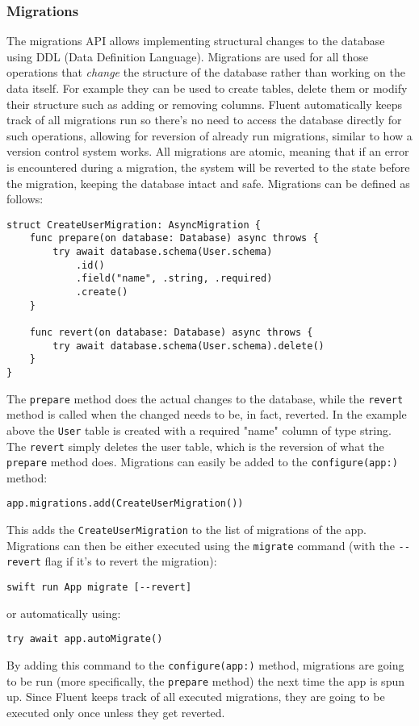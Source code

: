 \subsubsection{Migrations}
The migrations API allows implementing structural changes to the database using DDL (Data Definition Language).
Migrations are used for all those operations that \textit{change} the structure of the database rather than working on the data itself. For example they can be used to create tables, delete them or modify their structure such as adding or removing columns.
Fluent automatically keeps track of all migrations run so there's no need to access the database directly for such operations, allowing for reversion of already run migrations, similar to how a version control system works. All migrations are atomic, meaning that if an error is encountered during a migration, the system will be reverted to the state before the migration, keeping the database intact and safe. 
Migrations can be defined as follows:
\begin{verbatim}
struct CreateUserMigration: AsyncMigration {
    func prepare(on database: Database) async throws {
        try await database.schema(User.schema)
            .id()
            .field("name", .string, .required)
            .create()
    }

    func revert(on database: Database) async throws {
        try await database.schema(User.schema).delete()
    }
}
\end{verbatim}
The \lstinline{prepare} method does the actual changes to the database, while the \lstinline{revert} method is called when the changed needs to be, in fact, reverted. In the example above the \lstinline{User} table is created with a required "name" column of type string. The \lstinline{revert} simply deletes the user table, which is the reversion of what the \lstinline{prepare} method does.
Migrations can easily be added to the \lstinline{configure(app:)} method:
\begin{verbatim}
app.migrations.add(CreateUserMigration())
\end{verbatim}
This adds the \lstinline{CreateUserMigration} to the list of migrations of the app.
Migrations can then be either executed using the \lstinline{migrate} command (with the \lstinline{--revert} flag if it's to revert the migration):
\begin{verbatim}
swift run App migrate [--revert]
\end{verbatim}
or automatically using:
\begin{verbatim}
try await app.autoMigrate()
\end{verbatim}
By adding this command to the \lstinline{configure(app:)} method, migrations are going to be run (more specifically, the \lstinline{prepare} method) the next time the app is spun up. Since Fluent keeps track of all executed migrations, they are going to be executed only once unless they get reverted. \cite{vapor-docs}

